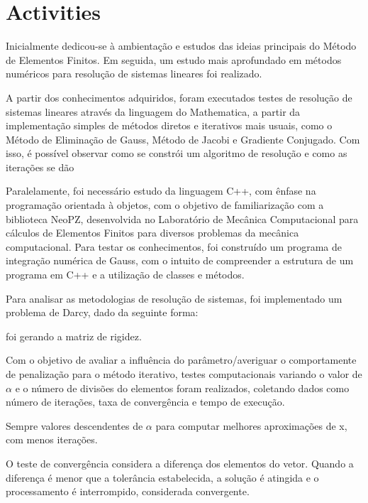 \documentclass[12pt]{article}
\begin{document}
\section{Activities}

Inicialmente dedicou-se à ambientação e estudos das ideias principais do Método de Elementos Finitos. Em seguida, um estudo mais aprofundado em 
métodos numéricos para resolução de sistemas lineares foi realizado. 

A partir dos conhecimentos adquiridos, foram executados testes de resolução de sistemas lineares através da linguagem do Mathematica, a partir da 
implementação simples de métodos diretos e iterativos mais usuais, como o Método de Eliminação de Gauss, Método de Jacobi e Gradiente Conjugado. 
Com isso, é possível observar como se constrói um algoritmo de resolução e como as iterações se dão

Paralelamente, foi necessário estudo da linguagem C++, com ênfase na programação orientada à objetos, com o objetivo de familiarização 
com a biblioteca NeoPZ, desenvolvida no Laboratório de Mecânica Computacional para cálculos de Elementos Finitos para diversos problemas 
da mecânica computacional. Para testar os conhecimentos, foi construído um programa de integração numérica de Gauss, com o intuito de 
compreender a estrutura de um programa em C++ e a utilização de classes e métodos. 

Para analisar as metodologias de resolução de sistemas, foi implementado um problema de Darcy, dado da seguinte forma:


foi gerando a matriz de rigidez. 

Com o objetivo de avaliar a influência do parâmetro/averiguar o comportamente de penalização para o método iterativo, testes computacionais 
variando o valor de \(\alpha\) e o número de divisões do elementos foram realizados, coletando dados como número de iterações, taxa de 
convergência e tempo de execução.

Sempre valores descendentes de \(\alpha\) para computar melhores aproximações de x, com menos iterações. %

O teste de convergência considera a diferença dos elementos do vetor. Quando a diferença é menor que a tolerância estabelecida, a solução é atingida 
e o processamento é interrompido, considerada convergente.
\end{document}
